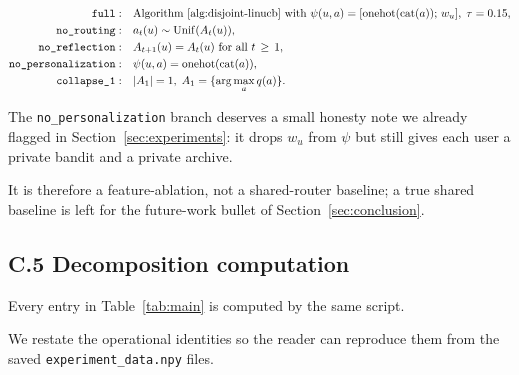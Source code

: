 \documentclass{article} %
\begin{document}
\begin{align}
\label{eq:app-impl-abl-full}
\texttt{full} :&\quad \text{Algorithm~\ref{alg:disjoint-linucb} with } \psi(u,a) = [\mathrm{onehot}(\mathrm{cat}(a));\, w_u],\; \tau=0.15,\\
\label{eq:app-impl-abl-noroute}
\texttt{no\_routing} :&\quad a_t(u) \sim \mathrm{Unif}(A_t(u)),\\
\label{eq:app-impl-abl-noref}
\texttt{no\_reflection} :&\quad A_{t+1}(u) = A_t(u) \text{ for all } t \,\ge\, 1,\\
\label{eq:app-impl-abl-nopers}
\texttt{no\_personalization} :&\quad \psi(u,a) = \mathrm{onehot}(\mathrm{cat}(a)),\\
\label{eq:app-impl-abl-coll1}
\texttt{collapse\_1} :&\quad |A_1| = 1,\; A_1 = \{\arg\max_{a} q(a)\}.
\end{align}

The \texttt{no\_personalization} branch deserves a small honesty note we already flagged in Section~\ref{sec:experiments}: it drops $w_u$ from $\psi$ but still gives each user a private bandit and a private archive.

It is therefore a feature-ablation, not a shared-router baseline; a true shared baseline is left for the future-work bullet of Section~\ref{sec:conclusion}.

\subsection{C.5 Decomposition computation}

\label{app:impl-decomp}

Every entry in Table~\ref{tab:main} is computed by the same script.

We restate the operational identities so the reader can reproduce them from the saved \texttt{experiment\_data.npy} files.
\end{document}
